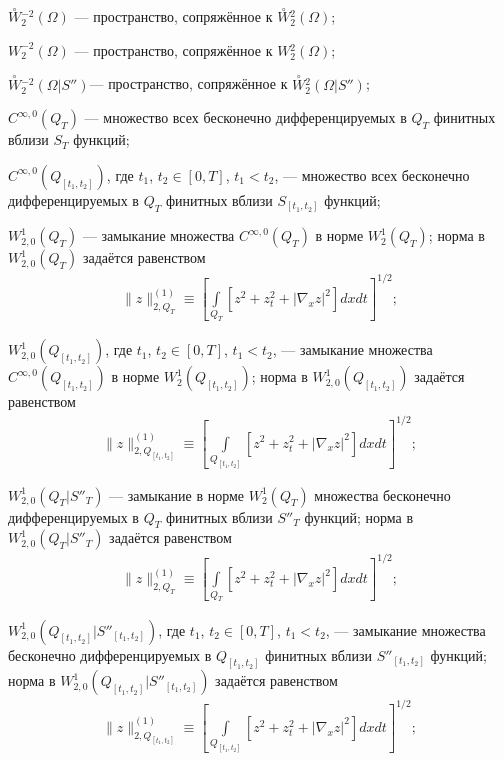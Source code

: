 \documentclass{report}
\begin{document}
$\stackrel{\circ}{W}\!^{-2}_2(\Omega)$ --- пространство, сопряжённое к $\stackrel{\circ}{W}\!\!^2_2(\Omega)$;

$W^{-2}_2(\Omega)$ --- пространство, сопряжённое к $W\!^2_2(\Omega)$;

$\stackrel{\circ}{W}\!^{-2}_2(\Omega|S'')$--- пространство, сопряжённое к $\stackrel{\circ}{W}\!\!^2_2(\Omega|S'')$;



$C^{\infty,0}(Q_T)$ --- множество всех бесконечно дифференцируемых в $Q_T$ финитных вблизи $S_T$ функций;

$C^{\infty,0}(Q_{[t_1,t_2]})$, где $t_1$, $t_2\in[0,T]$, $t_1< t_2$, --- множество всех бесконечно дифференцируемых в $Q_T$
финитных вблизи $S_{[t_1,t_2]}$ функций;

$W^1_{2,0}(Q_T)$ --- замыкание множества $C^{\infty,0}(Q_T)$ в норме $W^1_2(Q_T)$; норма в $W^1_{2,0}(Q_T)$ задаётся равенством
\begin{gather*}
\|z\|^{(1)}_{2,Q_T}\equiv\left[\int\limits_{Q_T}[z^2+z_t^2+|\nabla_x z|^2]dxdt\right]^{1/2};
\end{gather*}

$W^1_{2,0}(Q_{[t_1,t_2]})$, где $t_1$, $t_2\in[0,T]$, $t_1< t_2$, --- замыкание множества $C^{\infty,0}(Q_{[t_1,t_2]})$ в
норме $W^1_2(Q_{[t_1,t_2]})$; норма в $W^1_{2,0}(Q_{[t_1,t_2]})$ задаётся равенством
\begin{gather*}
\|z\|^{(1)}_{2,Q_{[t_1,t_2]}}\equiv\left[\int\limits_{Q_{[t_1,t_2]}}[z^2+z_t^2+|\nabla_x z|^2]dxdt\right]^{1/2};
\end{gather*}

$W^1_{2,0}(Q_T|S''_T)$ --- замыкание в норме $W^1_2(Q_T)$ множества бесконечно дифференцируемых в $Q_T$ финитных вблизи $S''_T$ функций; норма в $W^1_{2,0}(Q_T|S''_T)$ задаётся равенством
\begin{gather*}
\|z\|^{(1)}_{2,Q_T}\equiv\left[\int\limits_{Q_T}[z^2+z_t^2+|\nabla_x z|^2]dxdt\right]^{1/2};
\end{gather*}

$W^1_{2,0}(Q_{[t_1,t_2]}|S''_{[t_1,t_2]})$, где $t_1$, $t_2\in[0,T]$, $t_1< t_2$, --- замыкание множества  бесконечно дифференцируемых в $Q_{[t_1,t_2]}$ финитных вблизи $S''_{[t_1,t_2]}$
функций; норма в  $W^1_{2,0}(Q_{[t_1,t_2]}|S''_{[t_1,t_2]})$ задаётся равенством
\begin{gather*}
\|z\|^{(1)}_{2,Q_{[t_1,t_2]}}\equiv\left[\int\limits_{Q_{[t_1,t_2]}}[z^2+z_t^2+|\nabla_x z|^2]dxdt\right]^{1/2};
\end{gather*}
\end{document}
